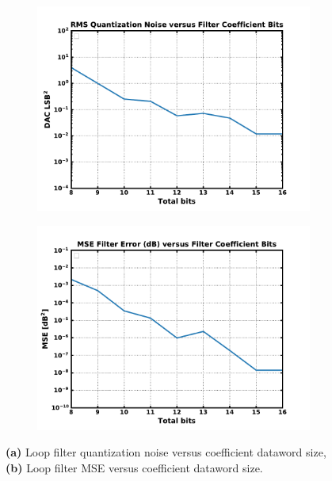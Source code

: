 	\begin{figure}[htb!]
	    \centering
	    \begin{subfigure}{0.5\textwidth}
	        \centering
	        \includegraphics[width=1\textwidth, angle=0]{./figs/design/lf_quant_noise}
	        \caption{ }
	        \label{fig:lf_quant_noise}
	    \end{subfigure}%
	    \begin{subfigure}{0.5\textwidth}
	        \centering
	        \includegraphics[width=1\textwidth, angle=0]{./figs/design/lf_mse}
	        \caption{ }
	        \label{fig:lf_mse}
	    \end{subfigure}
	    \caption{\textbf{(a)} Loop filter quantization noise versus coefficient dataword size, \textbf{(b)} Loop filter MSE versus coefficient dataword size.}
	    \label{fig:lf_bits_opt}
	\end{figure} 

